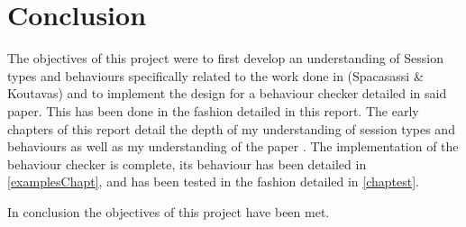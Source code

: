 \chapter{Conclusion}

The objectives of this project were to first develop an understanding of Session types and behaviours specifically related to the work done in (Spacasassi \& Koutavas)\cite{paper1} and to implement the design for a behaviour checker detailed in said paper. This has been done in the fashion detailed in this report. The early chapters of this report detail the depth of my understanding of session types and behaviours as well as my understanding of the paper \cite{paper1}. The implementation of the behaviour checker is complete, its behaviour has been detailed in \ref{examplesChapt}, and has been tested in the fashion detailed in \ref{chaptest}. 

In conclusion the objectives of this project have been met. 

